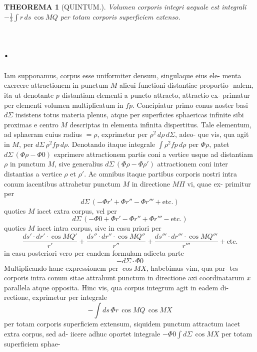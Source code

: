 \documentclass[12pt,a4paper]{article}
\theoremstyle{gauss}
\newtheorem*{theorema}{THEOREMA}
\begin{document}
\begin{theorema}[QUINTUM.]
Volumen corporis integri aequale est integrali $-\tfrac{1}{3}\int r\,ds\,\cos MQ$ per totam
corporis superficiem extenso.
\end{theorema}

\newpage
\setcounter{page}{18}

\section*{%
%
\thesection.}

Iam supponamus, corpus esse uniformiter densum, singulaque eius ele-
menta exercere attractionem in punctum $M$ alicui functioni distantiae proportio-
nalem, ita ut denotante $p$ distantiam elementi a puncto attracto, attractio ex-
primatur per elementi volumen multiplicatum in $fp$. Concipiatur primo conus
noster basi $d\Sigma$ insistens totus materia plenus, atque per superficies sphaericas
infinite sibi proximas e centro $M$ descriptas in elementa infinita dispertitus. Tale
elementum, ad sphaeram cuius radius $=\rho$, exprimetur per $\rho^2\,d\rho\,d\Sigma$, adeo-
que vis, qua agit in $M$, per $d\Sigma\,\rho^2 fp\,d\rho$. Denotando itaque integrale $\int\rho^2 fp\,d\rho$
per $\Phi\rho$, patet $d\Sigma\,(\Phi\rho - \Phi 0)$ exprimere attractionem partis coni a vertice usque
ad distantiam $\rho$ in punctum $M$, sive generalius $d\Sigma\,(\Phi\rho - \Phi\rho')$ attractionem
coni inter distantias a vertice $\rho$ et $\rho'$. Ac omnibus itaque partibus corporis nostri
intra conum iacentibus attrahetur punctum $M$ in directione $M\Pi$ vi, quae ex-
primitur per
\[
d\Sigma\,(-\Phi r' + \Phi r'' - \Phi r''' + \text{etc.})
\]
quoties $M$ iacet extra corpus, vel per
\[
d\Sigma\,(-\Phi 0 + \Phi r' - \Phi r'' + \Phi r''' - \text{etc.})
\]
quoties $M$ iacet intra corpus, sive in casu priori per
\[
\frac{ds'\cdot dr'\cdot\cos MQ'}{r'} + \frac{ds''\cdot dr''\cdot\cos MQ''}{r''} + \frac{ds'''\cdot dr'''\cdot\cos MQ'''}{r'''} + \text{etc.}
\]
in casu posteriori vero per eandem formulam adiecta parte
\[
-d\Sigma\cdot\Phi 0
\]
Multiplicando hanc expressionem per $\cos MX$, habebimus vim, qua par-
tes corporis intra conum sitae attrahunt punctum in directione axi coordinatarum
$x$ parallela atque opposita. Hinc vis, qua corpus integrum agit in eadem di-
rectione, exprimetur per integrale
\[
-\int ds\,\Phi r\,\cos MQ\,\cos MX
\]
per totam corporis superficiem extensum, siquidem punctum attractum iacet extra corpus, sed ad-
iicere adhuc oportet integrale $-\Phi 0\int d\Sigma\,\cos MX$ per totam superficiem sphae-
\end{document}
